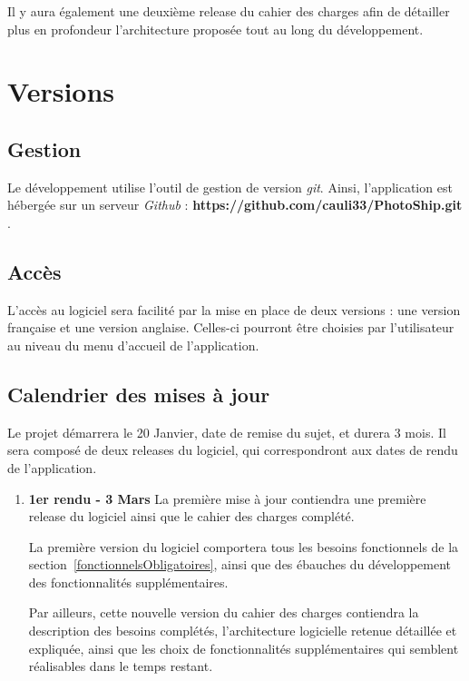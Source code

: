 \documentclass{article}
\begin{document}
Il y aura également une deuxième release du cahier des charges afin de détailler plus en profondeur l'architecture proposée tout au long du développement.

\section{Versions}

\subsection{Gestion}

Le développement utilise l'outil de gestion de version {\em git}.
Ainsi, l'application est hébergée sur un serveur {\em Github} : {\bf https://github.com/cauli33/PhotoShip.git }.

\subsection{Accès}

L'accès au logiciel sera facilité par la mise en place de deux versions : une version française et une version anglaise. Celles-ci pourront être choisies par l'utilisateur au niveau du menu d'accueil de l'application.

\subsection{Calendrier des mises à jour}

Le projet démarrera le 20 Janvier, date de remise du sujet, et durera 3 mois. Il sera composé de deux releases du logiciel, qui correspondront aux dates de rendu de l'application.

\label{dateMAJ}
\begin{enumerate}
\item {\bf 1er rendu - 3 Mars}
La première mise à jour contiendra une première release du logiciel ainsi que
le cahier des charges complété.

La première version du logiciel comportera
tous les besoins fonctionnels de la section~\ref{fonctionnelsObligatoires}, ainsi que des ébauches du développement des fonctionnalités supplémentaires.

Par ailleurs, cette nouvelle version du cahier des charges contiendra la description des besoins
complétés, l'architecture logicielle retenue détaillée et expliquée, ainsi que
les choix de fonctionnalités supplémentaires qui semblent
réalisables dans le temps restant.

\setcounter{numeroM}{\theenumi}
\end{enumerate}
\end{document}
